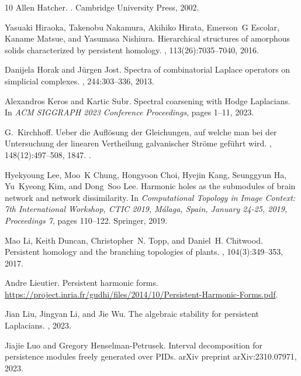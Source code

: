 \begin{thebibliography}{10}
Allen Hatcher.
.
\newblock Cambridge University Press, 2002.

Yasuaki Hiraoka, Takenobu Nakamura, Akihiko Hirata, Emerson~G Escolar, Kaname
  Matsue, and Yasumasa Nishiura.
\newblock Hierarchical structures of amorphous solids characterized by
  persistent homology.
,
  113(26):7035--7040, 2016.

Danijela Horak and J{\"u}rgen Jost.
\newblock Spectra of combinatorial {L}aplace operators on simplicial complexes.
, 244:303--336, 2013.

Alexandros Keros and Kartic Subr.
\newblock Spectral coarsening with {H}odge {L}aplacians.
\newblock In {\em ACM SIGGRAPH 2023 Conference Proceedings}, pages 1--11, 2023.

G.~Kirchhoff.
\newblock Ueber die {A}ufl{\"o}sung der {G}leichungen, auf welche man bei der
  {U}ntersuchung der linearen {V}ertheilung galvanischer {S}tr{\"o}me
  gef{\"u}hrt wird.
, 148(12):497--508, 1847.
\newblock \href {https://doi.org/10.1002/andp.18471481202}
  {}.

Hyekyoung Lee, Moo~K Chung, Hongyoon Choi, Hyejin Kang, Seunggyun Ha, Yu~Kyeong
  Kim, and Dong~Soo Lee.
\newblock Harmonic holes as the submodules of brain network and network
  dissimilarity.
\newblock In {\em Computational Topology in Image Context: 7th International
  Workshop, CTIC 2019, M{\'a}laga, Spain, January 24-25, 2019, Proceedings 7},
  pages 110--122. Springer, 2019.

Mao Li, Keith Duncan, Christopher~N. Topp, and Daniel~H. Chitwood.
\newblock Persistent homology and the branching topologies of plants.
, 104(3):349--353, 2017.

Andre Lieutier.
\newblock Persistent harmonic forms.
\newblock
  \url{https://project.inria.fr/gudhi/files/2014/10/Persistent-Harmonic-Forms.pdf}.

Jian Liu, Jingyan Li, and Jie Wu.
\newblock The algebraic stability for persistent {L}aplacians.
, 2023.

Jiajie Luo and Gregory Henselman-Petrusek.
\newblock Interval decomposition for persistence modules freely generated over
  {PIDs}.
\newblock arXiv preprint arXiv:2310.07971, 2023.


\end{thebibliography}
